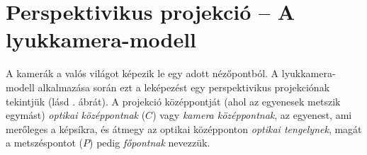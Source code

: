 \section{Perspektivikus projekció -- A lyukkamera-modell \label{sec:pinhole}}

A kamerák a valós világot képezik le egy adott nézőpontból. A lyukkamera-modell alkalmazása során ezt a leképezést egy perspektivikus projekciónak tekintjük \cite[2.2. fejezet]{pinhole-model} (lásd . ábrát). A projekció középpontját (ahol az egyenesek metszik egymást) \textit{optikai középpontnak} ($C$) vagy \textit{kamera középpontnak}, az egyenest, ami merőleges a képsíkra, és átmegy az optikai középponton \textit{optikai tengelynek}, magát a metszéspontot ($P$) pedig \textit{főpontnak} nevezzük.

